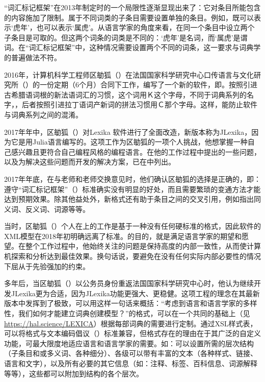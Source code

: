 “词汇标记框架”在2013年制定时的一个局限性逐渐显现出来了：它对条目所能包含的内容施加了限制。属于不同词类的子条目需要设置单独的条目。例如，既可以表示‘虎年’，也可以表示‘属虎’。从语言学家的角度来看，在同一个条目中设立两个子条目是可取的。但这两个词条的词类是不同的：‘虎年’是名词，而‘属虎’是谓词。在“词汇标记框架”中，这种情况需要设置两个不同的词条，这一要求与词典学的普遍做法不符。

2016年，计算机科学工程师区勄狐（）在法国国家科学研究中心口传语言与文化研究所（）的一份定期（6个月）合同下工作，编写了一个新的软件，即。按照引进古希腊语词根的新法语词汇的习惯，这个词用Ｋ这个字母，不同于词典系列的名字，\parencite{lexica2017}，后者按照引进拉丁语词产新词的拼法习惯用Ｃ那个字母。这样，能防止软件与词典系列之间的混淆。

2017年年中，区勄狐（）对Lexika 软件进行了全面改造\parencite{galliot:2017:lexika}，新版本称为JLexika，因为它是用Julia语言编写的。这项工作为区勄狐的一项个人挑战，他想掌握一种自己感兴趣且更符合自己编程风格的编程语言。在他的工作过程中提出的一些问题，以及为解决这些问题而开发的解决方案，已在\textcite{galliot:2023:lexikaproblématiques}中列出。

2017年年底，在与老师和老师交换意见时，他们确认区勄狐的选择是正确的，即：遵守“词汇标记框架”（）标准确实没有明显的好处，而且需要繁琐的变通方法才能达到预期效果。除其他益处外，新格式还有助于条目之间的交叉引用，例如指出同义词、反义词、词源等等。

当时，区勄狐（）个人在上的工作是基于一种没有任何硬标准的格式，因此软件的XML模型在2018年初明确远离了标准。的目的，就是满足语言学家的期望和愿望。在整个工作过程中，他始终关注的问题是保持高度的内部一致性，从而使计算机探索和分析达到最佳效果。换句话说，要避免在没有任何实际内部必要性的情况下屈从于先验强加的约束。

多年后，当区勄狐（）以公务员身份重返法国国家科学研究中心时，他认为继续开发JLexika更为合适，因为JLexika功能更强大、更稳健。这项工程的理念在其最新版本中发挥到了极致，可以用这样一句话来概括：“考虑到语言和语言学家的多样性，我们如何才能建立词典创建模型？”的格式，可以在一个共同的基础上（见\url{https://hal.science/LEXICA}）根据每部词典的需要进行定制。通过XSL样式表，可以将格式与文本编码倡议（）标准兼容，但格式存在的理由在于其广泛的自定义功能，可最大限度地适应语言和语言学家的需要。如：可以设置所需的层次结构（子条目和或多义词、各种细分）、各级可以带有丰富的文本（各种样式、链接、语言和文字），以及所有必要的其它信息（如：注释、标签、百科信息、词源解释等等），这些都可以附加到结构的各个层次。

